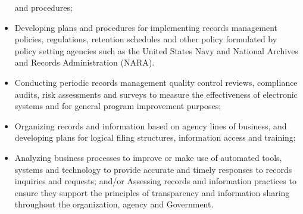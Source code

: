 \documentclass[a4papper,overlapped,line]{res}
\begin{document}
\begin{resume}
\begin{itemize}
	and procedures;
	\item Developing plans and procedures for implementing records management policies, 
	regulations, retention schedules and other policy formulated by policy setting 
	agencies such as the United States Navy and National Archives and Records Administration (NARA).
	\item Conducting periodic records management quality control reviews, compliance audits, 
	risk assessments and surveys to measure the effectiveness of electronic systems and 
	for general program improvement purposes; 
	\item Organizing records and information based on agency lines of business, and 
	developing plans for logical filing structures, information access and training; 
	\item Analyzing business processes to improve or make use of automated tools, systems  and technology to provide accurate and timely responses to records inquiries and  requests; and/or Assessing records and information practices to ensure they support the principles of transparency and information sharing throughout the organization, agency and Government.
\end{itemize}


\end{resume}
\end{document}
